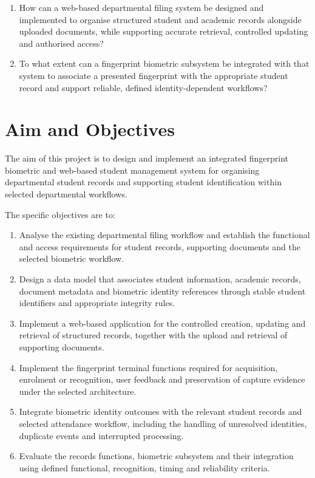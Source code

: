 \begin{enumerate}
\item How can a web-based departmental filing system be designed and implemented to organise structured student and academic records alongside uploaded documents, while supporting accurate retrieval, controlled updating and authorised access?
\item To what extent can a fingerprint biometric subsystem be integrated with that system to associate a presented fingerprint with the appropriate student record and support reliable, defined identity-dependent workflows?
\end{enumerate}

\section{Aim and Objectives}\label{sec:1-4}

The aim of this project is to design and implement an integrated fingerprint biometric and web-based student management system for organising departmental student records and supporting student identification within selected departmental workflows.

The specific objectives are to:

\begin{enumerate}
\item Analyse the existing departmental filing workflow and establish the functional and access requirements for student records, supporting documents and the selected biometric workflow.
\item Design a data model that associates student information, academic records, document metadata and biometric identity references through stable student identifiers and appropriate integrity rules.
\item Implement a web-based application for the controlled creation, updating and retrieval of structured records, together with the upload and retrieval of supporting documents.
\item Implement the fingerprint terminal functions required for acquisition, enrolment or recognition, user feedback and preservation of capture evidence under the selected architecture.
\item Integrate biometric identity outcomes with the relevant student records and selected attendance workflow, including the handling of unresolved identities, duplicate events and interrupted processing.
\item Evaluate the records functions, biometric subsystem and their integration using defined functional, recognition, timing and reliability criteria.
\end{enumerate}

